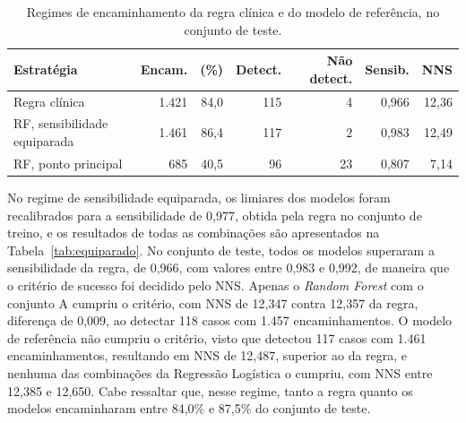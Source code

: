\begin{table}[htb]
  \centering
  \caption{\label{tab:regimes}Regimes de encaminhamento da regra clínica e do modelo de referência, no conjunto de teste.}
  \footnotesize
  \setlength{\tabcolsep}{4pt}
  \begin{tabular}{lrrrrrr}
    \hline
    Estratégia & Encam. & (\%) & Detect. & Não detect. & Sensib. & NNS \\ \hline
    Regra clínica & 1.421 & 84,0 & 115 & 4 & 0,966 & 12,36 \\
    RF, sensibilidade equiparada & 1.461 & 86,4 & 117 & 2 & 0,983 & 12,49 \\
    RF, ponto principal & 685 & 40,5 & 96 & 23 & 0,807 & 7,14 \\ \hline
  \end{tabular}
\end{table}

No regime de sensibilidade equiparada, os limiares dos modelos foram recalibrados para a sensibilidade de 0,977, obtida pela regra no conjunto de treino, e os resultados de todas as combinações são apresentados na Tabela~\ref{tab:equiparado}. No conjunto de teste, todos os modelos superaram a sensibilidade da regra, de 0,966, com valores entre 0,983 e 0,992, de maneira que o critério de sucesso foi decidido pelo NNS. Apenas o \textit{Random Forest} com o conjunto A cumpriu o critério, com NNS de 12,347 contra 12,357 da regra, diferença de 0,009, ao detectar 118 casos com 1.457 encaminhamentos. O modelo de referência não cumpriu o critério, visto que detectou 117 casos com 1.461 encaminhamentos, resultando em NNS de 12,487, superior ao da regra, e nenhuma das combinações da Regressão Logística o cumpriu, com NNS entre 12,385 e 12,650. Cabe ressaltar que, nesse regime, tanto a regra quanto os modelos encaminharam entre 84,0\% e 87,5\% do conjunto de teste.

